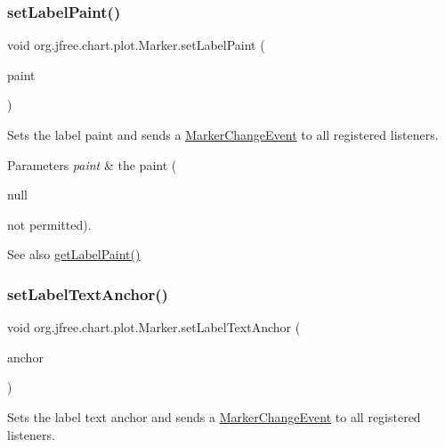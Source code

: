 \subsubsection{\texorpdfstring{set\+Label\+Paint()}{setLabelPaint()}}
{\footnotesize\ttfamily void org.\+jfree.\+chart.\+plot.\+Marker.\+set\+Label\+Paint (\begin{DoxyParamCaption}\item[{Paint}]{paint }\end{DoxyParamCaption})}

Sets the label paint and sends a \mbox{\hyperlink{}{Marker\+Change\+Event}} to all registered listeners.


\begin{DoxyParams}{Parameters}
{\em paint} & the paint (
\begin{DoxyCode}
null 
\end{DoxyCode}
 not permitted).\\
\hline
\end{DoxyParams}
\begin{DoxySeeAlso}{See also}
\mbox{\hyperlink{classorg_1_1jfree_1_1chart_1_1plot_1_1_marker_a25ff6c724ed30da3b8997d2bbca8ed25}{get\+Label\+Paint()}} 
\end{DoxySeeAlso}
\mbox{\label{classorg_1_1jfree_1_1chart_1_1plot_1_1_marker_a32c1fda6586338971917109d3a8684cf}} 
\subsubsection{\texorpdfstring{set\+Label\+Text\+Anchor()}{setLabelTextAnchor()}}
{\footnotesize\ttfamily void org.\+jfree.\+chart.\+plot.\+Marker.\+set\+Label\+Text\+Anchor (\begin{DoxyParamCaption}\item[{Text\+Anchor}]{anchor }\end{DoxyParamCaption})}

Sets the label text anchor and sends a \mbox{\hyperlink{}{Marker\+Change\+Event}} to all registered listeners.


